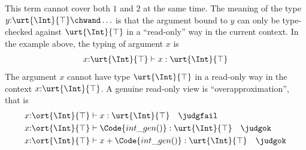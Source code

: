 This term cannot cover both $1$ and $2$ at the same time. The meaning of the type $y{:}\urt{\Int}{\top} \chwand \ldots$ is that the argument bound to $y$ can only be type-checked against $\urt{\Int}{\top}$ in a ``read-only'' way in the current context. In the example above, the typing of argument $x$ is
\begin{align*}
  x{:}\urt{\Int}{\top} \vdash x : \urt{\Int}{\top}
\end{align*}\noindent
The argument $x$ cannot have type $\urt{\Int}{\top}$ in a read-only way in the context $x{:}\urt{\Int}{\top}$. A genuine read-only view is ``overapproximation'', that is
\begin{align*}
  &x{:}\ort{\Int}{\top} \vdash x : \urt{\Int}{\top} \quad \judgfail
  \\&x{:}\ort{\Int}{\top} \vdash \Code{int\_gen()} : \urt{\Int}{\top} \quad \judgok
  \\&x{:}\ort{\Int}{\top} \vdash x + \Code{int\_gen()} : \urt{\Int}{\top} \quad \judgok
\end{align*}\noindent

